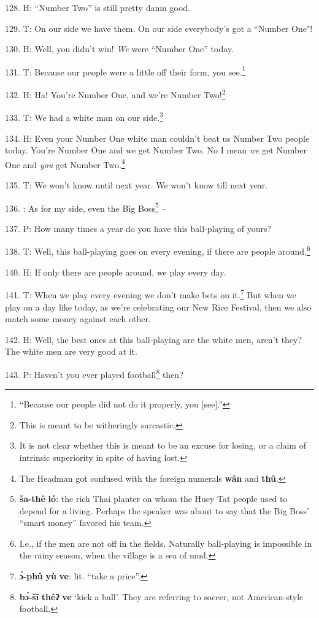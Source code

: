 128. H: ``Number Two'' is still pretty damn good.

129. T: On our side we have them. On our side everybody's got a ``Number
One"!

130. H: Well, you didn't win! \textit{We} were ``Number One'' today.

131. T: Because our people were a little off their form, you see.\footnote{``Because our people did not do it properly, you [see].''}

132. H: Ha! You're Number One, and we're Number Two!\footnote{This is meant to be witheringly sarcastic.}

133. T: We had a white man on our side.\footnote{It is not clear whether this is meant to be an excuse for losing, or a claim of intrinsic superiority in spite of having lost.}

134. H: Even your Number One white man couldn't beat us Number Two people today.
You're Number One and we get Number Two. No I mean \textit{we} get Number One and
\textit{you} get Number Two.\footnote{The Headman got confused with the foreign numerals \textbf{wân} and \textbf{thû}.}

135. T: We won't know until next year. We won't know till next year.

136. : As for my side, even the Big Boss\footnote{\textbf{ša-thê} \textbf{ló}: the rich Thai planter on whom the Huey Tat people used to depend for a living. Perhaps the speaker was about to say that the Big Boss' ``smart money'' favored his team.} --

137. P: How many times a year do you have this ball-playing of yours?

138. T: Well, this ball-playing goes on every evening, if there are people around.\footnote{I.e., if the men are not off in the fields. Naturally ball-playing is impossible in the rainy season, when the village is a sea of mud.}

140. H: If only there are people around, we play every day.

141. T: When we play every evening we don't make bets on it.\footnote{\textbf{ɔ̀-phû} \textbf{yù} \textbf{ve}: lit. ``take a price''.} But when we play
on a day like today, as we're celebrating our New Rice Festival, then we also match
some money against each other.

142. H: Well, the best ones at this ball-playing are the white men, aren't they?
The white men are very good at it.

143. P: Haven't you ever played football\footnote{\textbf{bɔ́-šī} \textbf{thêʔ} \textbf{ve} `kick a ball'. They are referring to soccer, not American-style football.} then?

